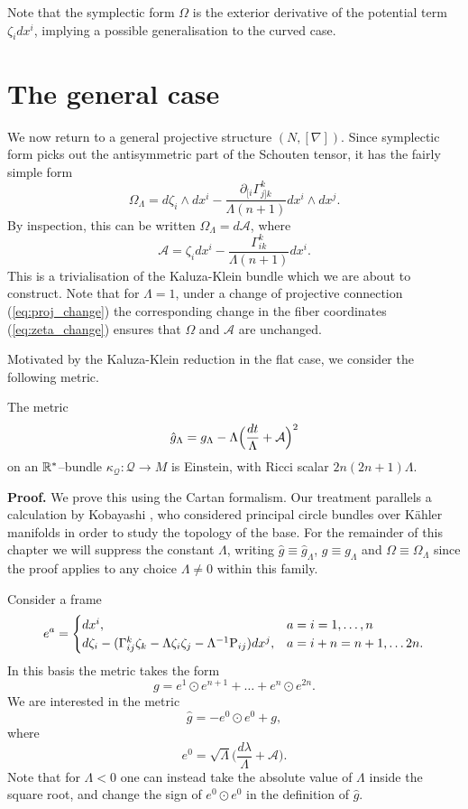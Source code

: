Note that the symplectic form $\Omega$ is the exterior derivative
of the potential term $\zeta_{i} dx^{i}$, implying a possible
generalisation to the curved case.


\section{The general case}

We now return to a general projective structure $(N,[\nabla])$. Since
symplectic form picks out the antisymmetric part of the Schouten tensor,
it has the fairly simple form
\[
\Omega_{\Lambda}= d\zeta_{i}\wedge dx^{i}-\frac{\partial_{[i}\Gamma_{j]k}^{k}}{\Lambda(n+1)} dx^{i}\wedge dx^{j}.
\]
By inspection, this can be written $\Omega_{\Lambda}=d\mathcal{A}$,
where
\[
\mathcal{A}=\zeta_{i} dx^{i}-\frac{\Gamma_{ik}^{k}}{\Lambda(n+1)} dx^{i}.
\]
This is a trivialisation of the Kaluza-Klein bundle which we are about
to construct. Note that for $\Lambda=1$, under a change of projective
connection (\ref{eq:proj_change}) the corresponding change in the
fiber coordinates (\ref{eq:zeta_change}) ensures that $\Omega$ and
$\mathcal{A}$ are unchanged.

Motivated by the Kaluza-Klein reduction in the flat case, we consider
the following metric.
\begin{theo}
The metric
\begin{equation}
\hat{g}_{\Lambda}=g_{\Lambda}-\Lambda\Bigl(\frac{ dt}{\Lambda}+\mathcal{A}\Bigr)^{2}\label{eq:G}
\end{equation}
on an $\mathbb{R}^*$--bundle $\kappa_\mathcal{Q}:\mathcal{Q}\rightarrow M$ is Einstein,
with Ricci scalar $2n(2n+1)\Lambda$.
\end{theo}
\textbf{Proof.} We prove this using the Cartan formalism. Our treatment
parallels a calculation by Kobayashi \cite{Kob}, who considered
principal circle bundles over K\"ahler manifolds in order to study the
topology of the base. For the remainder of this chapter we will suppress the constant $\Lambda$, writing $\hat{g}\equiv\hat{g}_{\Lambda}$, $g\equiv g_{\Lambda}$ and $\Omega\equiv\Omega_\Lambda$ since the proof applies to any choice $\Lambda\neq0$ within this family.

Consider a frame
\begin{equation}
e^{a}=\begin{cases}
 dx^{i}, & a=i=1,\dots,n\\
 d\zeta_{i}-(\Gamma_{ij}^{k}\zeta_{k}-\Lambda \zeta_{i}\zeta_{j}-\Lambda^{-1}\mathrm{P}_{ij}) dx^{j}, & a=i+n=n+1,\dots2n.
\end{cases}\label{eq:basis}
\end{equation}
In this basis the metric takes the form
\begin{equation}
g=e^{1}\odot e^{n+1}+\dots+e^{n}\odot e^{2n}.\label{eq:g_cov_const}
\end{equation}
We are interested in the metric
\[
\hat{g}=-e^{0}\odot e^{0}+g,
\]
where
\[
e^{0}=\sqrt{\Lambda}\biggl(\frac{ d\lambda}{\Lambda}+\mathcal{A}\biggr).
\]
Note that for $\Lambda<0$ one can instead take the absolute value of $\Lambda$ inside the square root, and change the sign of $e^{0}\odot e^{0}$ in the definition of $\hat{g}$.

